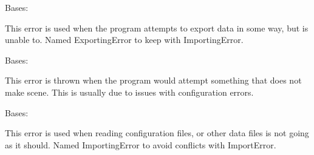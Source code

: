 \documentclass[letterpaper,10pt,english]{sphinxmanual}
\begin{document}

\begin{fulllineitems}
\label{\detokenize{python_docstrings/IfA_Smeargle.meta.errors:IfA_Smeargle.meta.errors.ExportingError}}
Bases: {\hyperref[\detokenize{python_docstrings/IfA_Smeargle.meta.errors:IfA_Smeargle.meta.errors.Smeargle_Exception}]{}}

This error is used when the program attempts to export data in some way,
but is unable to. Named ExportingError to keep with ImportingError.

\end{fulllineitems}


\begin{fulllineitems}
\label{\detokenize{python_docstrings/IfA_Smeargle.meta.errors:IfA_Smeargle.meta.errors.IllogicalProsedureError}}
Bases: {\hyperref[\detokenize{python_docstrings/IfA_Smeargle.meta.errors:IfA_Smeargle.meta.errors.Smeargle_Exception}]{}}

This error is thrown when the program would attempt something that does
not make scene. This is usually due to issues with configuration errors.

\end{fulllineitems}


\begin{fulllineitems}
\label{\detokenize{python_docstrings/IfA_Smeargle.meta.errors:IfA_Smeargle.meta.errors.ImportingError}}
Bases: {\hyperref[\detokenize{python_docstrings/IfA_Smeargle.meta.errors:IfA_Smeargle.meta.errors.Smeargle_Exception}]{}}

This error is used when reading configuration files, or other data files
is not going as it should. Named ImportingError to avoid conflicts with
ImportError.

\end{fulllineitems}
\end{document}
